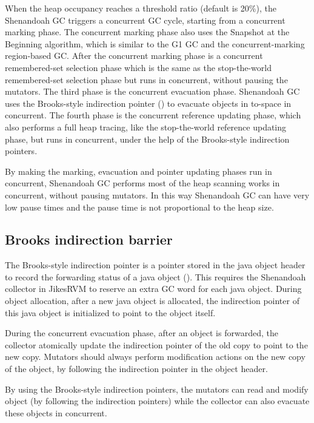 When the heap occupancy reaches a threshold ratio (default is 20\%), the Shenandoah GC triggers
a concurrent GC cycle, starting from a concurrent marking phase.
The concurrent marking phase also uses the Snapshot at the Beginning algorithm,
which is similar to the G1 GC and the concurrent-marking region-based GC.
After the concurrent marking phase is a concurrent remembered-set selection phase
which is the same as the stop-the-world remembered-set selection phase
but runs in concurrent, without pausing the mutators.
The third phase is the concurrent evacuation phase. Shenandoah GC uses the Brooks-style
indirection pointer (\cite{flood2016shenandoah}) to evacuate objects in to-space
in concurrent. The fourth phase is the concurrent reference updating phase, which
also performs a full heap tracing, like the stop-the-world reference updating phase,
but runs in concurrent, under the help of the Brooks-style indirection pointers.

By making the marking, evacuation and pointer updating phases run in concurrent, Shenandoah GC performs
most of the heap scanning works in concurrent, without pausing mutators. In this way
Shenandoah GC can have very low pause times and the pause time is not proportional
to the heap size.

\subsection{Brooks indirection barrier}


The Brooks-style indirection pointer is a pointer stored in the java object header
to record the forwarding status of a java object (\cite{flood2016shenandoah}).
This requires the Shenandoah collector in JikesRVM to reserve an extra GC word for each
java object. During object allocation, after a new java object is allocated, the indirection
pointer of this java object is initialized to point to the object itself.

During the concurrent evacuation phase, after an object is forwarded,
the collector atomically update the indirection pointer of the old copy to point to the new copy.
Mutators should always perform modification actions on the new copy of the object,
by following the indirection pointer in the object header.

By using the Brooks-style indirection pointers, the mutators can read and modify object 
(by following the indirection pointers) while the collector can also evacuate these
objects in concurrent.

